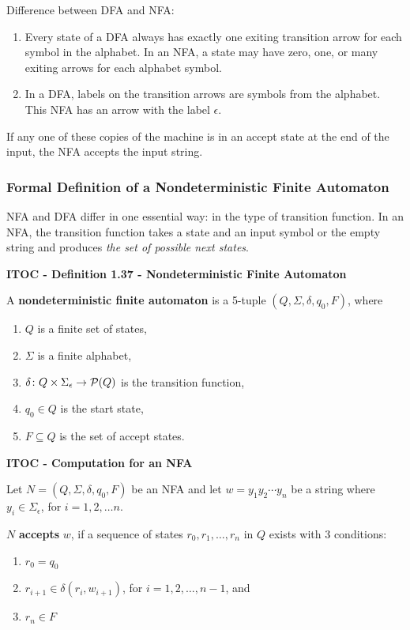 \medskip
Difference between DFA and NFA:
\begin{enumerate}
\item Every state of a DFA always has exactly one exiting transition arrow for each symbol in the alphabet. In an NFA, a state may have zero, one, or many exiting arrows for each alphabet symbol.
\item In a DFA, labels on the transition arrows are symbols from the alphabet. This NFA has an arrow with the label $\epsilon$.
\end{enumerate}

If any one of these copies of the machine is in an accept state at the end of the input, the NFA accepts the input string.

\subsubsection{Formal Definition of a Nondeterministic Finite Automaton}

NFA and DFA differ in one essential way: in the type of transition function. In an NFA, the transition function takes a state and an input symbol or the empty string and produces \textit{the set of possible next states}.

\begin{shaded}
\textbf{ITOC - Definition 1.37 - Nondeterministic Finite Automaton}

\medskip
A \textbf{nondeterministic finite automaton} is a 5-tuple $(Q, \Sigma, \delta, q_0, F)$, where
\begin{enumerate}
\item $Q$ is a finite set of states,
\item $\Sigma$ is a finite alphabet,
\item $\delta\colon Q \times \Sigma_\epsilon\rightarrow \mathcal{P}(Q)$ is the transition function,
\item $q_0 \in Q$ is the start state,
\item $F \subseteq Q$ is the set of accept states.
\end{enumerate}
\end{shaded}

\begin{shaded}
\textbf{ITOC - Computation for an NFA}

\medskip
Let $N = (Q, \Sigma, \delta, q_0, F)$ be an NFA and let $w = y_1 y_2 \cdots y_n$ be a string where $y_i \in \Sigma_\epsilon$, for $i = 1, 2, \ldots n$. 

$N$ \textbf{accepts} $w$, if a sequence of states $r_0, r_1, \ldots, r_n$ in $Q$ exists with 3 conditions:
\begin{enumerate}
\item $r_0 = q_0$
\item $r_{i+1} \in \delta(r_i, w_{i+1})$, for $i = 1, 2, \ldots, n-1$, and
\item $r_n \in F$ 
\end{enumerate}
\end{shaded}

